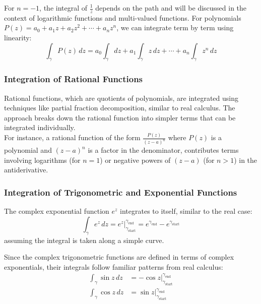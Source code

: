 \noindent For $n = -1$, the integral of $\frac{1}{z}$ depends on the path and will be discussed in the context of logarithmic functions and multi-valued functions. For polynomials $P(z) = a_0 + a_1z + a_2z^2 + \cdots + a_nz^n$, we can integrate term by term using linearity:
\[
\int_{\gamma} P(z) \, dz = a_0 \int_{\gamma} dz + a_1 \int_{\gamma} z \, dz + \cdots + a_n \int_{\gamma} z^n \, dz
\]

\subsubsection*{Integration of Rational Functions}

\noindent Rational functions, which are quotients of polynomials, are integrated using techniques like partial fraction decomposition, similar to real calculus. The approach breaks down the rational function into simpler terms that can be integrated individually. \\

\noindent For instance, a rational function of the form $\frac{P(z)}{(z-a)^n}$ where $P(z)$ is a polynomial and $(z-a)^n$ is a factor in the denominator, contributes terms involving logarithms (for $n=1$) or negative powers of $(z-a)$ (for $n>1$) in the antiderivative.

\subsubsection*{Integration of Trigonometric and Exponential Functions}

\noindent The complex exponential function $e^z$ integrates to itself, similar to the real case:
\[
\int_{\gamma} e^z \, dz = \left. e^z \right|_{\gamma_{\text{start}}}^{\gamma_{\text{end}}} = e^{\gamma_{\text{end}}} - e^{\gamma_{\text{start}}}
\]
assuming the integral is taken along a simple curve.

\noindent Since the complex trigonometric functions are defined in terms of complex exponentials, their integrals follow familiar patterns from real calculus:
\begin{align*}
\int_{\gamma} \sin z \, dz &= \left. -\cos z \right|_{\gamma_{\text{start}}}^{\gamma_{\text{end}}} \\
\int_{\gamma} \cos z \, dz &= \left. \sin z \right|_{\gamma_{\text{start}}}^{\gamma_{\text{end}}}
\end{align*}

